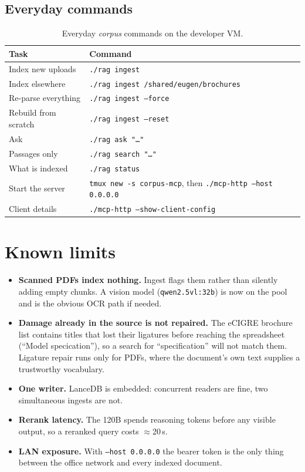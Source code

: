 \documentclass[11pt,a4paper]{article}
\newcommand{\cmd}[1]{\texttt{\small #1}}
\begin{document}
\subsection{Everyday commands}

\begin{table}[!ht]
  \centering
  \renewcommand{\arraystretch}{1.25}
  \begin{tabularx}{\linewidth}{@{}l X@{}}
    \toprule
    \textbf{Task} & \textbf{Command} \\\midrule
    Index new uploads    & \cmd{./rag ingest} \\\midrule
    Index elsewhere      & \cmd{./rag ingest /shared/eugen/brochures} \\\midrule
    Re-parse everything  & \cmd{./rag ingest --force} \\\midrule
    Rebuild from scratch & \cmd{./rag ingest --reset} \\\midrule
    Ask                  & \cmd{./rag ask "\dots"} \\\midrule
    Passages only        & \cmd{./rag search "\dots"} \\\midrule
    What is indexed      & \cmd{./rag status} \\\midrule
    Start the server     & \cmd{tmux new -s corpus-mcp}, then \cmd{./mcp-http --host 0.0.0.0} \\\midrule
    Client details       & \cmd{./mcp-http --show-client-config} \\\bottomrule
  \end{tabularx}
  \caption{Everyday \textit{corpus} commands on the developer VM.}
  \label{tab:corpus-commands}
\end{table}

\section{Known limits}

\begin{itemize}\itemsep1pt
  \item \textbf{Scanned PDFs index nothing.} Ingest flags them rather than
        silently adding empty chunks. A vision model (\cmd{qwen2.5vl:32b}) is
        now on the pool and is the obvious OCR path if needed.
  \item \textbf{Damage already in the source is not repaired.} The eCIGRE
        brochure list contains titles that lost their ligatures before reaching
        the spreadsheet (``Model specication''), so a search for
        ``specification'' will not match them. Ligature repair runs only for
        PDFs, where the document's own text supplies a trustworthy vocabulary.
  \item \textbf{One writer.} LanceDB is embedded: concurrent readers are fine,
        two simultaneous ingests are not.
  \item \textbf{Rerank latency.} The 120B spends reasoning tokens before any
        visible output, so a reranked query costs $\approx$20\,s.
  \item \textbf{LAN exposure.} With \cmd{--host 0.0.0.0} the bearer token is
        the only thing between the office network and every indexed document.
\end{itemize}
\end{document}
